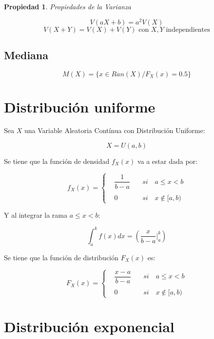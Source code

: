 \documentclass[a5paper,12pt,twoside]{book}
\newtheorem{prop}{{Propiedad}}[chapter]
\begin{document}
\begin{prop}
Propiedades de la Varianza
\end{prop}

$$ V(aX+b)=a^2 V(X) $$
$$ V(X+Y)=V(X)+V(Y) \text{ con } X,Y \textrm{ independientes} $$

\subsection{Mediana}

\begin{equation}
M(X)=\{ x \in Ran(X) / F_X(x)=0.5 \}
\end{equation}

\section{Distribución uniforme}

Sea $X$ una Variable Aleatoria Contínua con Distribución Uniforme:

\begin{equation}
X=U(a,b)
\end{equation}

Se tiene que la función de densidad $f_X(x)$ va a estar dada por:

\begin{equation}
f_X(x)= \left\{
\begin{array}{rcl}
&\dfrac{1}{b-a}& \quad si \quad a \leq x < b
\\
\\
&0& \quad si \quad x \notin [a,b)
\end{array}
\right.
\end{equation}

Y al integrar la rama $a \leq x < b$:

$$ \int_a^k f(x)dx = \left( \dfrac{x}{b-a} \Big|_a^k \right) $$

Se tiene que la función de distribución $F_X(x)$ es:

\begin{equation}
F_X(x)= \left\{
\begin{array}{rcl}
&\dfrac{x-a}{b-a}& \quad si \quad a \leq x < b
\\
\\
&0& \quad si \quad x \notin [a,b)
\end{array}
\right.
\end{equation}

\section{Distribución exponencial}
\end{document}

